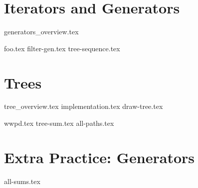\documentclass{exam}
\begin{document}
\section{Iterators and Generators}
{generators_overview.tex}
\begin{questions}
	{foo.tex}
	{filter-gen.tex}
	{tree-sequence.tex}
\end{questions}
\newpage
\section{Trees}
{tree_overview.tex}
{implementation.tex}
{draw-tree.tex}
\begin{questions}
{wwpd.tex}
{tree-sum.tex}
{all-paths.tex}
\end{questions}

\newpage
\section{Extra Practice: Generators}
\begin{questions}
	{all-sums.tex}
\end{questions}
\end{document}

